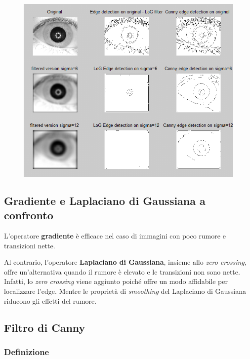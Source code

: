 \documentclass[a4paper]{article}
\begin{document}
	\begin{figure}[!htp]
		\centering
		\includegraphics[width=\textwidth]{img/filtro_laplaciano_gaussiana.png}
	\end{figure}\newpage
	
	\subsection{Gradiente e Laplaciano di Gaussiana a confronto}
	
	L'operatore \textbf{gradiente} è efficace nel caso di immagini con poco rumore e transizioni nette.\newline
	
	\noindent
	Al contrario, l'operatore \textbf{Laplaciano di Gaussiana}, insieme allo \emph{zero crossing}, offre un'alternativa quando il rumore è elevato e le transizioni non sono nette.\newline
	Infatti, lo \emph{zero crossing} viene aggiunto poiché offre un modo affidabile per localizzare l'edge. Mentre le proprietà di \emph{smoothing} del Laplaciano di Gaussiana riducono gli effetti del rumore.\newpage
	
	\subsection{Filtro di Canny}
	
	\subsubsection{Definizione}
	
\end{document}
